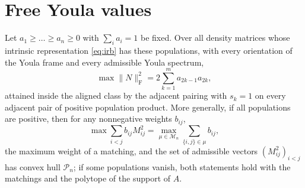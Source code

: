 \documentclass[11pt]{article}
\newcommand{\F}{\mathrm F}
\newcommand{\cM}{\mathcal M}
\newcommand{\cP}{\mathcal P}
\begin{document}
\section{Free Youla values}

\begin{theorem}\label{thm:free}
Let $a_1\ge\dots\ge a_n\ge0$ with $\sum_ia_i=1$ be fixed. Over all density matrices whose
intrinsic representation \eqref{eq:irb} has these populations, with every
orientation of the Youla frame and every admissible Youla spectrum,
\begin{equation}\label{eq:free}
\max\|N\|_\F^2=2\sum_{k=1}^{m}a_{2k-1}a_{2k},
\end{equation}
attained inside the aligned class by the adjacent pairing with $s_k=1$ on
every adjacent pair of positive population product. More generally, if all populations are positive, then for any
nonnegative weights $b_{ij}$,
\begin{equation}\label{eq:weights}
\max\sum_{i<j}b_{ij}M_{ij}^2=\max_{\mu\in\cM_n}\sum_{\{i,j\}\in\mu}b_{ij},
\end{equation}
the maximum weight of a matching, and the set of admissible vectors
$(M_{ij}^2)_{i<j}$ has convex hull $\cP_n$; if some populations vanish, both
statements hold with the matchings and the polytope of the support of $A$.
\end{theorem}
\end{document}
